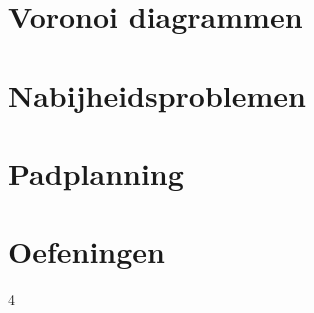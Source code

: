 \documentclass[12pt,a4paper]{article}
\begin{document}
\part{Voronoi diagrammen}

\iffalse
\section{Bewijs: ``Een voronoi veelhoek van een punt $p_i$ is begrensd <=> $p_i$ element van $inw(CH(S))$'' Bespreek het nut van deze stelling.}
\section{Bewijs dat minimale doorloopboom deelverzameling is van de Delaunay triangulatie. Wat is het nut van deze eigenschap?}
\section{Bewijs: "Twee dichtste buren hebben een gemeenschappelijke voronoi zijde"}
\section{Geen een strategie en een hoog-niveau algoritme  voor het vinden van de maximale lege cirkel binnen de COV van een verzameling punten.}
\section{Bespreek de event punten in het algoritme van Fortune Welke acties moeten ondernomen worden?}
\fi

\part{Nabijheidsproblemen}

\iffalse
\section{wat is een EMDB van een vz punten + verband met Voronoi diagramma van een vz punten?}
\section{bespreek beknopt hoe een EMDB van een vz punten kan berkend worden in O(nlogn) bewerkingen}
\fi


\part{Padplanning}


\part{Oefeningen}




4





\end{document}
